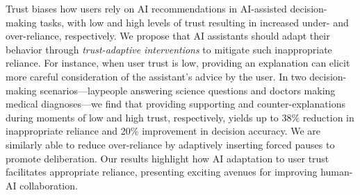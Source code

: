 Trust biases how users rely on AI recommendations in AI-assisted decision-making tasks, with low and high levels of trust resulting in increased under- and over-reliance, respectively. 
We propose that AI assistants should adapt their behavior through \emph{trust-adaptive interventions} to mitigate such inappropriate reliance. 
For instance, when user trust is low, providing an explanation can elicit more careful consideration of the assistant's advice by the user. 
In two decision-making scenarios---laypeople answering science questions and doctors making medical diagnoses---we find that providing supporting and counter-explanations during moments of low and high trust, respectively, yields up to 38\% reduction in inappropriate reliance and 20\% improvement in decision accuracy. 
We are similarly able to reduce over-reliance by adaptively inserting forced pauses to promote deliberation. 
Our results highlight how AI adaptation to user trust facilitates appropriate reliance, presenting exciting avenues for improving human-AI collaboration.
